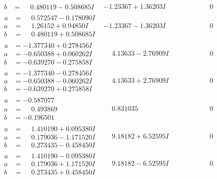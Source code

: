 \documentclass[1p]{elsarticle_modified}
\theoremstyle{definition}
\begin{document}
$$\begin{array}{c|c|c}
\begin{aligned}
b &= \phantom{-}0.480119 - 0.508685 I\end{aligned}
 & -1.23367 + 1.36203 I & \phantom{-0.000000 } 0 \\ \hline\begin{aligned}
u &= \phantom{-}0.572547 - 0.178090 I \\
a &= \phantom{-}1.26152 + 0.94850 I \\
b &= \phantom{-}0.480119 + 0.508685 I\end{aligned}
 & -1.23367 - 1.36203 I & \phantom{-0.000000 } 0 \\ \hline\begin{aligned}
u &= -1.377340 + 0.278456 I \\
a &= -0.650388 + 0.060262 I \\
b &= -0.639270 - 0.275858 I\end{aligned}
 & \phantom{-}4.13633 - 2.76909 I & \phantom{-0.000000 } 0 \\ \hline\begin{aligned}
u &= -1.377340 - 0.278456 I \\
a &= -0.650388 - 0.060262 I \\
b &= -0.639270 + 0.275858 I\end{aligned}
 & \phantom{-}4.13633 + 2.76909 I & \phantom{-0.000000 } 0 \\ \hline\begin{aligned}
u &= -0.587077\phantom{ +0.000000I} \\
a &= \phantom{-}0.493869\phantom{ +0.000000I} \\
b &= -0.196501\phantom{ +0.000000I}\end{aligned}
 & \phantom{-}0.831035\phantom{ +0.000000I} & \phantom{-0.000000 } 0 \\ \hline\begin{aligned}
u &= \phantom{-}1.410190 + 0.095380 I \\
a &= \phantom{-}0.179036 - 1.171520 I \\
b &= \phantom{-}0.273435 - 0.458450 I\end{aligned}
 & \phantom{-}9.18182 + 6.52595 I & \phantom{-0.000000 } 0 \\ \hline\begin{aligned}
u &= \phantom{-}1.410190 - 0.095380 I \\
a &= \phantom{-}0.179036 + 1.171520 I \\
b &= \phantom{-}0.273435 + 0.458450 I\end{aligned}
 & \phantom{-}9.18182 - 6.52595 I & \phantom{-0.000000 } 0 \\ \hline\begin{aligned}

\end{aligned}
\end{array}$$
\end{document}
